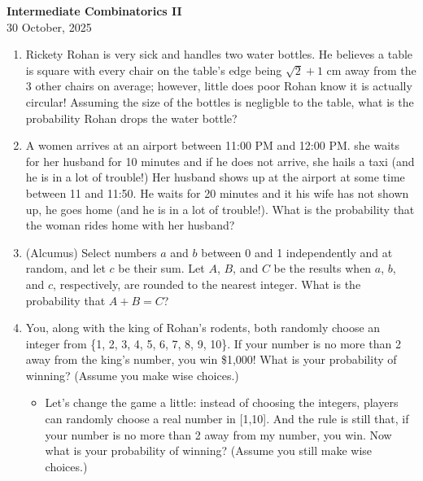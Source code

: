\documentclass[a4paper]{article}
\begin{document}
\begin{center}
{\Large\bfseries Intermediate Combinatorics II}\\[0.25cm]
{\large 30 October, 2025}\\[1cm]
\end{center}

\begin{enumerate}[itemsep=2.85cm]
    \item Rickety Rohan is very sick and handles two water bottles. He believes a table is square with every chair on the table's edge being $\sqrt 2 + 1 \text{ cm}$ away from the 3 other chairs on average; however, little does poor Rohan know it is actually circular! Assuming the size of the bottles is negligble to the table, what is the probability Rohan drops the water bottle?

    \item A women arrives at an airport between 11:00 PM and 12:00 PM. she waits for her husband for 10 minutes and if he does not arrive, she hails a taxi (and he is in a lot of trouble!) Her husband shows up at the airport at some time between 11 and 11:50. He waits for 20 minutes and it his wife has not shown up, he goes home (and he is in a lot of trouble!). What is the probability that the woman rides home with her husband?

    \item (Alcumus) Select numbers $a$ and $b$ between 0 and 1 independently and at random, and let $c$ be their sum. Let $A$, $B$, and $C$ be the results when $a$, $b$, and $c$, respectively, are rounded to the nearest integer. What is the probability that $A+B=C$?
    
    \item You, along with the king of Rohan's rodents, both randomly choose an integer from \{1, 2, 3, 4, 5, 6, 7, 8, 9, 10\}. If your number is no more than 2 away from the king's number, you win \$1,000! What is your probability of winning? (Assume you make wise choices.)

    \vspace{2.85cm}

    \begin{itemize}
    \item Let’s change the game a little: instead of choosing the integers, players can randomly choose a real number in [1,10]. And the rule is still that, if your number is no more than 2 away from my number, you win. Now what is your probability of winning? (Assume you still make wise choices.)
    \end{itemize}
    

\end{enumerate}
\end{document}
